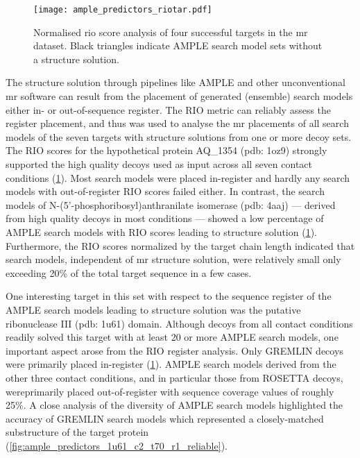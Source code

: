 \begin{figure}[H]
    \centering
    \texttt{[image: ample\_predictors\_riotar.pdf]}
    \caption[RIO score analysis of successful targets]{Normalised \gls{rio} score analysis of four successful targets in the \gls{mr} dataset. Black triangles indicate AMPLE search model sets without a structure solution.}
    \label{fig:ample_predictor_riotar}
\end{figure}

The structure solution through pipelines like AMPLE and other unconventional \gls{mr} software \cite{Rodriguez2012-ad,Sammito2013-ug} can result from the placement of generated (ensemble) search models either in- or out-of-sequence register. The RIO metric \cite{Thomas2015-wu} can reliably assess the register placement, and thus was used to analyse the \gls{mr} placements of all search models of the seven targets with structure solutions from one or more decoy sets. The RIO scores for the hypothetical protein AQ\_1354 (\gls{pdb}: 1oz9) strongly supported the high quality decoys used as input across all seven contact conditions (\cref{fig:ample_predictor_riotar}). Most search models were placed in-register and hardly any search models with out-of-register RIO scores failed either. In contrast, the search models of N-(5’-phosphoribosyl)anthranilate isomerase (\gls{pdb}: 4aaj) --- derived from high quality decoys in most conditions --- showed a low percentage of AMPLE search models with RIO scores leading to structure solution (\cref{fig:ample_predictor_riotar}). Furthermore, the RIO scores normalized by the target chain length indicated that search models, independent of \gls{mr} structure solution, were relatively small only exceeding 20\% of the total target sequence in a few cases. 

One interesting target in this set with respect to the sequence register of the AMPLE search models leading to structure solution was the putative ribonuclease III (\gls{pdb}: 1u61) domain. Although decoys from all contact conditions readily solved this target with at least 20 or more AMPLE search models, one important aspect arose from the RIO register analysis. Only GREMLIN decoys were primarily placed in-register (\cref{fig:ample_predictor_riotar}). AMPLE search models derived from the other three contact conditions, and in particular those from ROSETTA decoys, wereprimarily placed out-of-register with sequence coverage values of roughly 25\%. A close analysis of the diversity of AMPLE search models highlighted the accuracy of GREMLIN search models which represented a closely-matched substructure of the target protein (\cref{fig:ample_predictors_1u61_c2_t70_r1_reliable}).  


